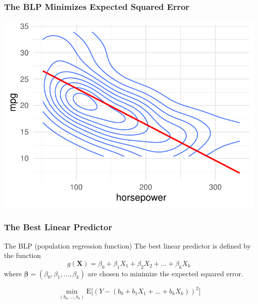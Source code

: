 \documentclass[12pt, block=fill]{beamer}
\newcommand{\E}{\text{E}}
\begin{document}
\begin{frame}
  \frametitle{The BLP Minimizes Expected Squared Error}
  \includegraphics[width=\textwidth]{images/mpg_lm}
\end{frame}


\begin{frame}[t]
  \frametitle{The Best Linear Predictor}

  \begin{block}{The BLP (population regression function)}
    The best linear predictor is defined by the function 
    \[g(\mathbf{X}) = \beta_{0} + \beta_{1}X_{1} + \beta_{2} X_{2} +
      \dots + \beta_{k}X_{k}\] 
    where $\boldsymbol{\beta} = (\beta_0, \beta_1,...,\beta_k)$ are
    chosen to minimize the expected squared error.
    
    \[
      \min_{(b_{0}, \dots, b_{k})}
      \E\big[ (Y - (b_0  + b_1 X_1 + ... +b_k X_k))^2\big]
    \] 
  \end{block}
\end{frame}
\end{document}
